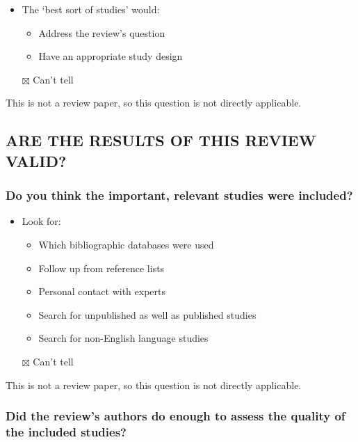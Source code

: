 \documentclass[
  doc, a4paper]{apa7}
\providecommand{\tightlist}{%
  \setlength{\itemsep}{0pt}\setlength{\parskip}{0pt}}
\begin{document}
\begin{itemize}
\tightlist
\item
  The `best sort of studies' would:

  \begin{itemize}
  \tightlist
  \item
    Address the review's question
  \item
    Have an appropriate study design
  \end{itemize}
\item[$\boxtimes$]
  Can't tell
\end{itemize}

This is not a review paper, so this question is not directly applicable.

\subsection{ARE THE RESULTS OF THIS REVIEW VALID?}\label{are-the-results-of-this-review-valid}

\subsubsection{Do you think the important, relevant studies were included?}\label{do-you-think-the-important-relevant-studies-were-included}

\begin{itemize}
\tightlist
\item
  Look for:

  \begin{itemize}
  \tightlist
  \item
    Which bibliographic databases were used
  \item
    Follow up from reference lists
  \item
    Personal contact with experts
  \item
    Search for unpublished as well as published studies
  \item
    Search for non-English language studies
  \end{itemize}
\item[$\boxtimes$]
  Can't tell
\end{itemize}

This is not a review paper, so this question is not directly applicable.

\subsubsection{Did the review's authors do enough to assess the quality of the included studies?}\label{did-the-reviews-authors-do-enough-to-assess-the-quality-of-the-included-studies}
\end{document}
